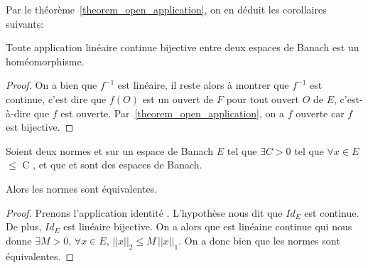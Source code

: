 Par le théorème~\ref{theorem_open_application}, on en déduit les corollaires
suivants:

\begin{corollary}
	Toute application linéaire continue bijective entre deux espaces de Banach
	est un homéomorphisme.
\end{corollary}

\begin{proof}
	On a bien que $f^{-1}$ est linéaire, il reste alors à montrer que $f^{-1}$
	est continue, c'est dire que $f(O)$ est un ouvert de $F$ pour tout ouvert
	$O$ de $E$, c'est-à-dire que $f$ est ouverte.
	Par~\ref{theorem_open_application}, on a $f$ ouverte car $f$ est bijective.
\end{proof}

\begin{corollary}
	Soient deux normes  et  sur un espace de
	Banach $E$ tel que $\exists C > 0$ tel que $\forall x \in E$
	 $\leq$ C , et que
	 et 
	sont des espaces de Banach.
	
	Alors les normes sont équivalentes.
\end{corollary}

\begin{proof}
	Prenons l'application identité . L'hypothèse nous dit que $Id_{E}$ est continue. De plus,
	$Id_{E}$ est linéaire bijective. On a alors que
	 est linéaine
	continue qui nous donne $\exists M > 0, \, \forall x \in E, \,
	||x||_{2} \leq M \, ||x||_{1}$. On a donc bien que les normes sont
	équivalentes.
	
\end{proof}
